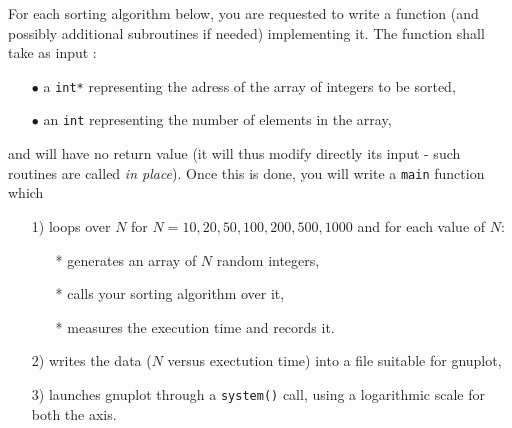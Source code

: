 \documentclass[a4paper,12pt]{article}
\begin{document}
For each sorting algorithm below, you are requested to write a function (and possibly additional subroutines if needed) implementing it. The function shall take as input :\\[-5pt]
\begin{itemize}
\item[$\bullet$] a \verb?int*? representing the adress of the array of integers to be sorted,
\item[$\bullet$] an \verb?int? representing the number of elements in the array,\\[-5pt]
\end{itemize}
and will have no return value (it will thus modify directly its input - such routines are 
called {\it in place}). Once this is done, you will write a \verb?main? function which\\[-5pt]
\begin{itemize}
\item[{1)}] loops over $N$ for $N= 10, 20, 50, 100, 200, 500, 1000$ and for each value of $N$:
\begin{itemize}
\item[*] generates an array of $N$ random integers,
\item[*] calls your sorting algorithm over it,
\item[*] measures the execution time and records it.
\end{itemize}
\item[{2)}] writes the data ($N$ versus exectution time) into a file suitable for gnuplot,
\item[{3)}] launches gnuplot through a {\tt system()} call, using a logarithmic scale for both the axis.
\end{itemize}
\end{document}
